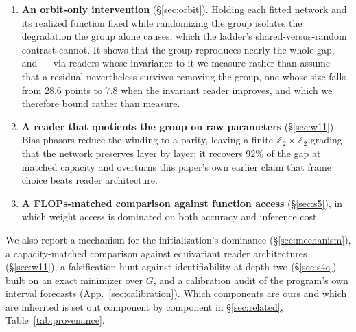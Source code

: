 \documentclass[10pt,letterpaper]{article}
\theoremstyle{definition}
\newcommand{\Z}{\mathbb{Z}}
\begin{document}
\begin{enumerate}
into what an exact change of frame removes and what it cannot. Registered before any cell was
computed, and scored against the frozen text.
\item \textbf{An orbit-only intervention} (\S\ref{sec:orbit}). Holding each fitted network and its
realized function fixed while randomizing the group isolates the degradation the group alone
causes, which the ladder's shared-versus-random contrast cannot. It shows that the group reproduces
nearly the whole gap, and --- via readers whose invariance to it we measure rather than assume ---
that a residual nevertheless survives removing the group, one whose size falls from $28.6$ points to
$7.8$ when the invariant reader improves, and which we therefore bound rather than measure.
\item \textbf{A reader that quotients the group on raw parameters} (\S\ref{sec:w11}). Bias phasors
reduce the winding to a parity, leaving a finite $\Z_2\times\Z_2$ grading that the network preserves
layer by layer; it recovers $92\%$ of the gap at matched capacity and overturns this paper's own
earlier claim that frame choice beats reader architecture.
\item \textbf{A FLOPs-matched comparison against function access} (\S\ref{sec:s5}), in which
weight access is dominated on both accuracy and inference cost.
\end{enumerate}

We also report a mechanism for the initialization's dominance (\S\ref{sec:mechanism}), a
capacity-matched comparison against equivariant reader architectures (\S\ref{sec:w11}), a
falsification hunt against identifiability at depth two (\S\ref{sec:s4e}) built on an exact
minimizer over $G$, and a calibration audit of the program's own interval forecasts
(App.~\ref{sec:calibration}). Which components are ours and which are inherited is set out
component by component in \S\ref{sec:related}, Table~\ref{tab:provenance}.
\end{document}
